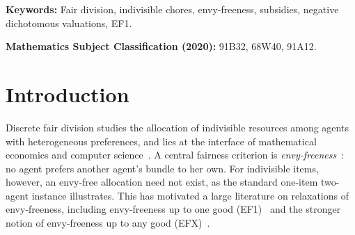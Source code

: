 \documentclass[11pt]{article}
\theoremstyle{plain}
\theoremstyle{plain}
\begin{document}
%
%

\medskip
\noindent\textbf{Keywords:}
Fair division, indivisible chores, envy-freeness, subsidies,
negative dichotomous valuations, EF1.

\medskip
\noindent\textbf{Mathematics Subject Classification (2020):}
91B32, 68W40, 91A12.
\section{Introduction}
\label{sec:intro}
Discrete fair division studies the allocation of indivisible resources among agents with heterogeneous preferences, and lies at the interface of mathematical economics and computer science~\cite{BCE16,End17}. A central fairness criterion is \emph{envy-freeness}~\cite{Fol67,Var74}: no agent prefers another agent's bundle to her own. For indivisible items, however, an envy-free allocation need not exist, as the standard one-item two-agent instance illustrates. This has motivated a large literature on relaxations of envy-freeness, including envy-freeness up to one good (EF1)~\cite{Bud11,LMMS04} and the stronger notion of envy-freeness up to any good (EFX)~\cite{CKMPSW19}.
\end{document}
